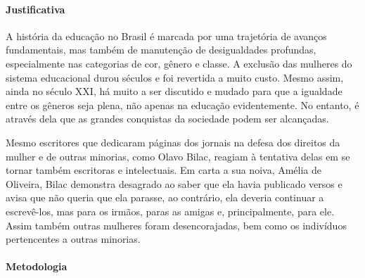 \documentclass[12pt]{extarticle}
\begin{document}
\paragraph{Justificativa} A história da educação no Brasil é marcada por
uma trajetória de avanços fundamentais, mas também de manutenção de
desigualdades profundas, especialmente nas categorias de cor, gênero e
classe. A exclusão das mulheres do sistema educacional durou séculos e
foi revertida a muito custo. Mesmo assim, ainda no século XXI, há muito
a ser discutido e mudado para que a igualdade entre os gêneros seja
plena, não apenas na educação evidentemente. No entanto, é através dela
que as grandes conquistas da sociedade podem ser alcançadas.

Mesmo escritores que dedicaram páginas dos jornais na defesa dos
direitos da mulher e de outras minorias, como Olavo Bilac, reagiam à
tentativa delas em se tornar também escritoras e intelectuais. Em carta
a sua noiva, Amélia de Oliveira, Bilac demonstra desagrado ao saber que
ela havia publicado versos e avisa que não queria que ela parasse, ao
contrário, ela deveria continuar a escrevê-los, mas para os irmãos,
paras as amigas e, principalmente, para ele. Assim também outras
mulheres foram desencorajadas, bem como os indivíduos pertencentes a
outras minorias.

\paragraph{Metodologia}
\end{document}
